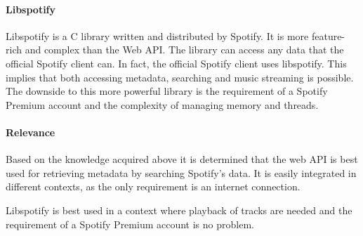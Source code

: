 \paragraph{Libspotify}
\label{par:music_catalog_libspotify}

Libspotify is a C library written and distributed by Spotify. It is more feature-rich and complex than the Web API. The library can access any data that the official Spotify client can. In fact, the official Spotify client uses libspotify. This implies that both accessing metadata, searching and music streaming is possible. The downside to this more powerful library is the requirement of a Spotify Premium account and the complexity of managing memory and threads.

\paragraph{Relevance}
\label{par:relevance}

Based on the knowledge acquired above it is determined that the web API is best used for retrieving metadata by searching Spotify's data. It is easily integrated in different contexts, as the only requirement is an internet connection.

Libspotify is best used in a context where playback of tracks are needed and the requirement of a Spotify Premium account is no problem.
